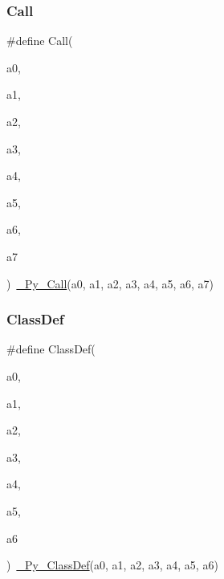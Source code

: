 \mbox{\label{_python-ast_8h_a67521ede95e4d7bdfd5aced80c17a3aa}} 
\subsubsection{\texorpdfstring{Call}{Call}}
{\footnotesize\ttfamily \#define Call(\begin{DoxyParamCaption}\item[{}]{a0,  }\item[{}]{a1,  }\item[{}]{a2,  }\item[{}]{a3,  }\item[{}]{a4,  }\item[{}]{a5,  }\item[{}]{a6,  }\item[{}]{a7 }\end{DoxyParamCaption})~\mbox{\hyperlink{_python-ast_8h_a8df37634337d0ad319ac213dc055560d}{\+\_\+\+Py\+\_\+\+Call}}(a0, a1, a2, a3, a4, a5, a6, a7)}

\mbox{\label{_python-ast_8h_abdc9d5fc24b79057eecd50c7dea3bfdd}} 
\subsubsection{\texorpdfstring{ClassDef}{ClassDef}}
{\footnotesize\ttfamily \#define Class\+Def(\begin{DoxyParamCaption}\item[{}]{a0,  }\item[{}]{a1,  }\item[{}]{a2,  }\item[{}]{a3,  }\item[{}]{a4,  }\item[{}]{a5,  }\item[{}]{a6 }\end{DoxyParamCaption})~\mbox{\hyperlink{_python-ast_8h_a4c475d7bf15d3fcf2565d6ed0bbdedad}{\+\_\+\+Py\+\_\+\+Class\+Def}}(a0, a1, a2, a3, a4, a5, a6)}

\mbox{\label{_python-ast_8h_ae328ce3376c52a3dba42ab3708d5571b}} 
